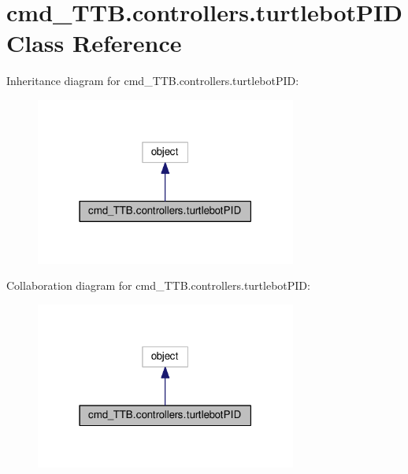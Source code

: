 \hypertarget{classcmd__TTB_1_1controllers_1_1turtlebotPID}{}\section{cmd\+\_\+\+T\+T\+B.\+controllers.\+turtlebot\+P\+ID Class Reference}
\label{classcmd__TTB_1_1controllers_1_1turtlebotPID}


Inheritance diagram for cmd\+\_\+\+T\+T\+B.\+controllers.\+turtlebot\+P\+ID\+:\nopagebreak
\begin{figure}[H]
\begin{center}
\leavevmode
\includegraphics[width=243pt]{classcmd__TTB_1_1controllers_1_1turtlebotPID__inherit__graph}
\end{center}
\end{figure}


Collaboration diagram for cmd\+\_\+\+T\+T\+B.\+controllers.\+turtlebot\+P\+ID\+:\nopagebreak
\begin{figure}[H]
\begin{center}
\leavevmode
\includegraphics[width=243pt]{classcmd__TTB_1_1controllers_1_1turtlebotPID__coll__graph}
\end{center}
\end{figure}
